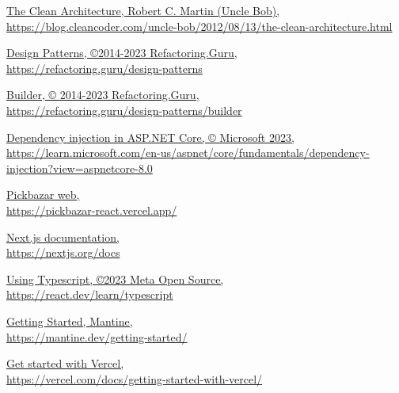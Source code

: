 \documentclass[12pt, a4paper]{report}
\theoremstyle{definition}
\begin{document}
\listoffigures
\listoftables








\begin{thebibliography}{80}
     \href{https://blog.cleancoder.com/uncle-bob/2012/08/13/the-clean-architecture.html}{\color{black}The Clean Architecture, Robert C. Martin (Uncle Bob), \\ https://blog.cleancoder.com/uncle-bob/2012/08/13/the-clean-architecture.html}

     \href{https://refactoring.guru/design-patterns}{\color{black}Design Patterns, ©2014-2023 Refactoring.Guru, \\
    https://refactoring.guru/design-patterns}
    
     \href{https://refactoring.guru/design-patterns/builder}{\color{black}Builder, © 2014-2023 Refactoring.Guru, \\
    https://refactoring.guru/design-patterns/builder}
    
     \href{https://learn.microsoft.com/en-us/aspnet/core/fundamentals/dependency-injection?view=aspnetcore-8.0}{\color{black}Dependency injection in ASP.NET Core, © Microsoft 2023, \\ https://learn.microsoft.com/en-us/aspnet/core/fundamentals/dependency-injection?view=aspnetcore-8.0}

     \href{https://pickbazar-react.vercel.app/}{\color{black}Pickbazar web, \\https://pickbazar-react.vercel.app/}

     \href{https://nextjs.org/docs}{\color{black}Next.js documentation, \\https://nextjs.org/docs}

     \href{https://react.dev/learn/typescript}{\color{black}Using Typescript, ©2023 Meta Open Source, \\https://react.dev/learn/typescript}

     \href{https://mantine.dev/getting-started/}{\color{black}Getting Started, Mantine,\\https://mantine.dev/getting-started/}

     \href{https://vercel.com/docs/getting-started-with-vercel}{\color{black}Get started with Vercel,\\https://vercel.com/docs/getting-started-with-vercel/}
    

\end{thebibliography}
\end{document}
